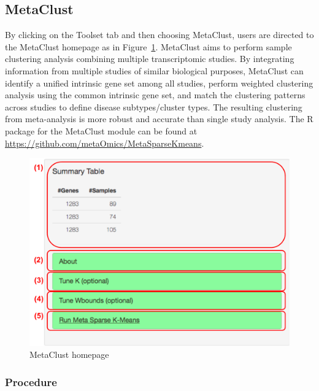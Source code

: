 \subsection{MetaClust}
By clicking on the Toolset tab and then choosing MetaClust,
users are directed to the MetaClust homepage as in Figure~\ref{fig:metaClustHome}.
MetaClust \citep{huo2016meta} aims to perform sample clustering analysis combining multiple transcriptomic studies.
By integrating information from multiple studies of similar biological purposes,
MetaClust can identify a unified intrinsic gene set among all studies, perform weighted clustering analysis using the common intrinsic gene set, 
and match the clustering patterns across studies to define disease subtypes/cluster types.
The resulting clustering from meta-analysis is more robust and accurate than single study analysis.
The R package for the MetaClust module can be found at \url{https://github.com/metaOmics/MetaSparseKmeans}.


\begin{figure}[H]
\begin{center}
\includegraphics[scale=0.4]{./figure/metaClust/metaClustHome.pdf}
\caption{MetaClust homepage}
\label{fig:metaClustHome}
\end{center}
\end{figure}

\subsubsection{Procedure}



